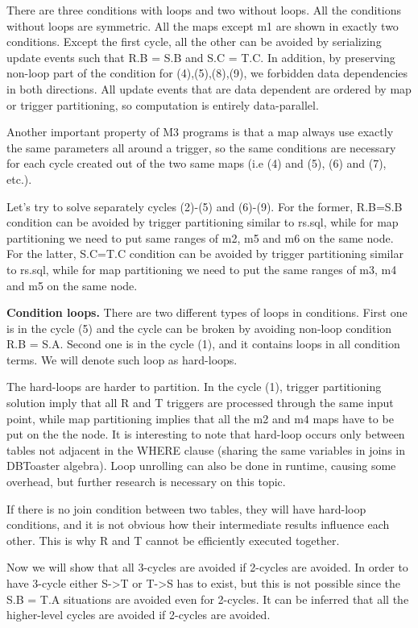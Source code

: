 \documentclass{sig-semester}
\begin{document}
There are three conditions with loops and two without loops. All the conditions without loops are symmetric. All the maps except m1 are shown in exactly two conditions. Except the first cycle, all the other can be avoided by serializing update events such that R.B = S.B and S.C = T.C. In addition, by preserving non-loop part of the condition for (4),(5),(8),(9), we forbidden data dependencies in both directions. All update events that are data dependent are ordered by map or trigger partitioning, so computation is entirely data-parallel.

Another important property of M3 programs is that a map always use exactly the same parameters all around a trigger, so the same conditions are necessary for each cycle created out of the two same maps (i.e (4) and (5), (6) and (7), etc.).

Let's try to solve separately cycles (2)-(5) and (6)-(9). For the former, R.B=S.B condition can be avoided by trigger partitioning similar to rs.sql, while for map partitioning we need to put same ranges of m2, m5 and m6 on the same node. For the latter, S.C=T.C condition can be avoided by trigger partitioning similar to rs.sql, while for map partitioning we need to put the same ranges of m3, m4 and m5 on the same node.

\textbf{Condition loops.} There are two different types of loops in conditions. First one is in the cycle (5) and the cycle can be broken by avoiding non-loop condition R.B = S.A. Second one is in the cycle (1), and it contains loops in all condition terms. We will denote such loop as hard-loops.

The hard-loops are harder to partition. In the cycle (1), trigger partitioning solution imply that all R and T triggers are processed through the same input point, while map partitioning implies that all the m2 and m4 maps have to be put on the the node. It is interesting to note that hard-loop occurs only between tables not adjacent in the WHERE clause (sharing the same variables in joins in DBToaster algebra). Loop unrolling can also be done in runtime, causing some overhead, but further research is necessary on this topic.

If there is no join condition between two tables, they will have hard-loop conditions, and it is not obvious how their intermediate results influence each other. This is why R and T cannot be efficiently executed together.

Now we will show that all 3-cycles are avoided if 2-cycles are avoided. In order to have 3-cycle either S->T or T->S has to exist, but this is not possible since the S.B = T.A situations are avoided even for 2-cycles. It can be inferred that all the higher-level cycles are avoided if 2-cycles are avoided.
\end{document}
